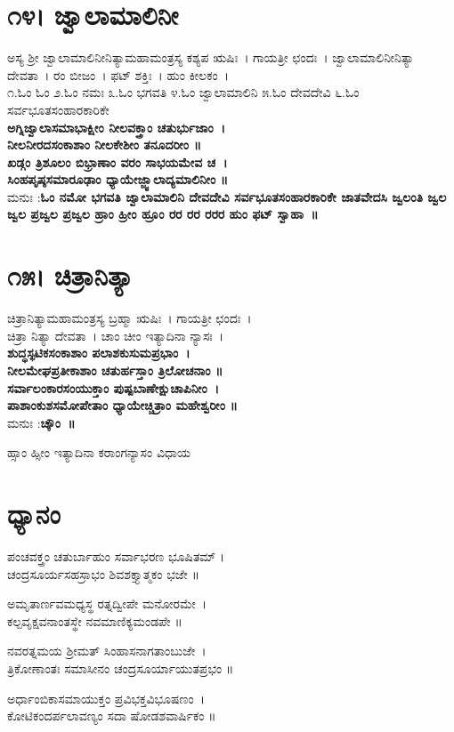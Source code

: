 \section{೧೪। ಜ್ವಾಲಾಮಾಲಿನೀ}
ಅಸ್ಯ ಶ್ರೀ ಜ್ವಾಲಾಮಾಲಿನೀನಿತ್ಯಾಮಹಾಮಂತ್ರಸ್ಯ ಕಶ್ಯಪ ಋಷಿಃ~। ಗಾಯತ್ರೀ ಛಂದಃ~। ಜ್ವಾಲಾಮಾಲಿನೀನಿತ್ಯಾ ದೇವತಾ~। ರಂ ಬೀಜಂ~। ಫಟ್ ಶಕ್ತಿಃ~। ಹುಂ ಕೀಲಕಂ~।\\
೧.ಓಂ ಓಂ ೨.ಓಂ ನಮಃ ೩.ಓಂ ಭಗವತಿ ೪.ಓಂ ಜ್ವಾಲಾಮಾಲಿನಿ ೫.ಓಂ ದೇವದೇವಿ ೬.ಓಂ ಸರ್ವಭೂತಸಂಹಾರಕಾರಿಕೇ \\
{\bfseries ಅಗ್ನಿಜ್ವಾಲಾಸಮಾಭಾಕ್ಷೀಂ ನೀಲವಕ್ತ್ರಾಂ ಚತುರ್ಭುಜಾಂ~।\\ನೀಲನೀರದಸಂಕಾಶಾಂ ನೀಲಕೇಶೀಂ ತನೂದರೀಂ ॥\\
ಖಡ್ಗಂ ತ್ರಿಶೂಲಂ ಬಿಭ್ರಾಣಾಂ ವರಂ ಸಾಭಯಮೇವ ಚ~।\\ಸಿಂಹಪೃಷ್ಠಸಮಾರೂಢಾಂ ಧ್ಯಾಯೇಜ್ಜ್ವಾಲಾದ್ಯಮಾಲಿನೀಂ ॥\\}
ಮನುಃ :{\bfseries  ಓಂ ನಮೋ ಭಗವತಿ ಜ್ವಾಲಾಮಾಲಿನಿ ದೇವದೇವಿ ಸರ್ವಭೂತಸಂಹಾರಕಾರಿಕೇ ಜಾತವೇದಸಿ ಜ್ವಲಂತಿ ಜ್ವಲ ಜ್ವಲ ಪ್ರಜ್ವಲ ಪ್ರಜ್ವಲ ಹ್ರಾಂ ಹ್ರೀಂ ಹ್ರೂಂ ರರ ರರ ರರರ ಹುಂ ಫಟ್ ಸ್ವಾಹಾ~॥}
\section{೧೫। ಚಿತ್ರಾನಿತ್ಯಾ}
ಚಿತ್ರಾನಿತ್ಯಾಮಹಾಮಂತ್ರಸ್ಯ ಬ್ರಹ್ಮಾ ಋಷಿಃ~। ಗಾಯತ್ರೀ ಛಂದಃ~। \\ಚಿತ್ರಾ ನಿತ್ಯಾ ದೇವತಾ~। ಚಾಂ ಚೀಂ ಇತ್ಯಾದಿನಾ ನ್ಯಾಸಃ~।\\
\newpage
{\bfseries ಶುದ್ಧಸ್ಫಟಿಕಸಂಕಾಶಾಂ ಪಲಾಶಕುಸುಮಪ್ರಭಾಂ~।\\
ನೀಲಮೇಘಪ್ರತೀಕಾಶಾಂ ಚತುರ್ಹಸ್ತಾಂ ತ್ರಿಲೋಚನಾಂ ॥\\
ಸರ್ವಾಲಂಕಾರಸಂಯುಕ್ತಾಂ ಪುಷ್ಪಬಾಣೇಕ್ಷುಚಾಪಿನೀಂ~।\\
ಪಾಶಾಂಕುಶಸಮೋಪೇತಾಂ ಧ್ಯಾಯೇಚ್ಚಿತ್ರಾಂ ಮಹೇಶ್ವರೀಂ ॥\\}
ಮನುಃ :{\bfseries  ಚ್ಕೌಂ~॥}

ಹ್ಸಾಂ ಹ್ಸೀಂ ಇತ್ಯಾದಿನಾ ಕರಾಂಗನ್ಯಾಸಂ ವಿಧಾಯ
\section{ಧ್ಯಾನಂ}
ಪಂಚವಕ್ತ್ರಂ ಚತುರ್ಬಾಹುಂ ಸರ್ವಾಭರಣ ಭೂಷಿತಮ್ ।\\
ಚಂದ್ರಸೂರ್ಯಸಹಸ್ರಾಭಂ ಶಿವಶಕ್ತ್ಯಾತ್ಮಕಂ ಭಜೇ ॥

ಅಮೃತಾರ್ಣವಮಧ್ಯಸ್ಥ ರತ್ನದ್ವೀಪೇ ಮನೋರಮೇ~।\\
ಕಲ್ಪವೃಕ್ಷವನಾಂತಸ್ಥೇ ನವಮಾಣಿಕ್ಯಮಂಡಪೇ ॥

ನವರತ್ನಮಯ ಶ್ರೀಮತ್ ಸಿಂಹಾಸನಾಗತಾಂಬುಜೇ~।\\
ತ್ರಿಕೋಣಾಂತಃ ಸಮಾಸೀನಂ ಚಂದ್ರಸೂರ್ಯಾಯುತಪ್ರಭಂ ॥

ಅರ್ಧಾಂಬಿಕಾಸಮಾಯುಕ್ತಂ ಪ್ರವಿಭಕ್ತವಿಭೂಷಣಂ~।\\
ಕೋಟಿಕಂದರ್ಪಲಾವಣ್ಯಂ ಸದಾ ಷೋಡಶವಾರ್ಷಿಕಂ ॥

